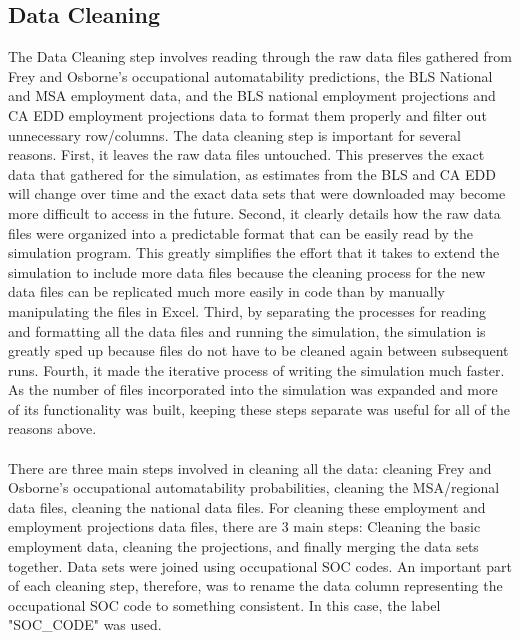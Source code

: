 \documentclass[10pt]{article}
\begin{document}
\subsection{Data Cleaning}
The Data Cleaning step involves reading through the raw data files gathered from Frey and Osborne's occupational automatability predictions, the BLS National and MSA employment data, and the BLS national employment projections and CA EDD employment projections data to format them properly and filter out unnecessary row/columns. The data cleaning step is important for several reasons. First, it leaves the raw data files untouched. This preserves the exact data that gathered for the simulation, as estimates from the BLS and CA EDD will change over time and the exact data sets that were downloaded may become more difficult to access in the future. Second, it clearly details how the raw data files were organized into a predictable format that can be easily read by the simulation program. This greatly simplifies the effort that it takes to extend the simulation to include more data files because the cleaning process for the new data files can be replicated much more easily in code than by manually manipulating the files in Excel. Third, by separating the processes for reading and formatting all the data files and running the simulation, the simulation is greatly sped up because files do not have to be cleaned again between subsequent runs. Fourth, it made the iterative process of writing the simulation much faster. As the number of files incorporated into the simulation was expanded and more of its functionality was built, keeping these steps separate was useful for all of the reasons above.\\\\ There are three main steps involved in cleaning all the data: cleaning Frey and Osborne's occupational automatability probabilities, cleaning the MSA/regional data files, cleaning the national data files. For cleaning these employment and employment projections data files, there are 3 main steps: Cleaning the basic employment data, cleaning the projections, and finally merging the data sets together. Data sets were joined using occupational SOC codes. An important part of each cleaning step, therefore, was to rename the data column representing the occupational SOC code to something consistent. In this case, the label "SOC\_CODE" was used. 
\end{document}
